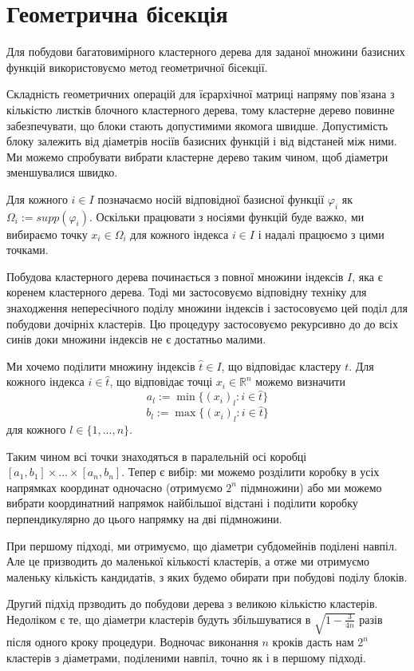 \documentclass[12pt]{report}
\begin{document}
 	\section{Геометрична бісекція}
	\hspace{0.8cm} Для побудови багатовимірного кластерного дерева для заданої множини базисних функцій використовуємо метод геометричної бісекції.
	\par Складність геометричних операцій для їєрархічної матриці напряму пов'язана з кількістю листків блочного кластерного дерева, тому кластерне дерево повинне забезпечувати, що блоки стають допустимими якомога швидше. Допустимість блоку залежить від діаметрів носіїв базисних функцій і від відстаней між ними. Ми можемо спробувати вибрати кластерне дерево таким чином, щоб діаметри зменшувалися швидко.
	\par Для кожного $i\in I$ позначаємо носій відповідної базисної функції $\varphi_i$ як $\Omega_i:=supp(\varphi_i)$. Оскільки працювати з носіями функцій буде важко, ми вибираємо точку $x_i\in\Omega_i$ для кожного індекса $i\in I$ і надалі працюємо з цими точками.
	\par Побудова кластерного дерева починається з повної множини індексів $I$, яка є коренем кластерного дерева. Тоді ми застосовуємо відповідну техніку для знаходження непересічного поділу множини індексів і застосовуємо цей поділ для побудови дочірніх кластерів. Цю процедуру застосовуємо рекурсивно до до всіх синів доки множини індексів не є достатньо малими. 
	\par Ми хочемо поділити множину індексів $\hat t\in I$, що відповідає кластеру $t$. Для кожного індекса $i \in \hat t$, що відповідає точці $x_i\in\mathbb{R}^n$ можемо визначити
	$$a_l:=\min \{(x_i)_l : i\in \hat t\}$$
	$$b_l:=\max \{(x_i)_l : i\in \hat t\}$$
	для кожного $l\in \{1,...,n\}$. 
	\par Таким чином всі точки знаходяться в паралельній осі коробці $[a_1,b_1]\times...\times[a_n,b_n]$. Тепер є вибір: ми можемо розділити коробку в усіх напрямках координат одночасно (отримуємо $2^n$ підмножини) або ми можемо вибрати координатний напрямок найбільшої відстані і поділити коробку перпендикулярно до цього напрямку на дві підмножини.
	\par При першому підході, ми отримуємо, що діаметри субдомейнів поділені навпіл. Але це призводить до маленької кількості кластерів, а отже ми отримуємо маленьку кількість кандидатів, з яких будемо обирати при побудові поділу блоків.
	\par Другий підхід прзводить до побудови дерева з великою кількістю кластерів. Недоліком є те, що діаметри кластерів будуть збільшуватися в $\sqrt{
	1-\frac{3}{4n}}$ разів після одного кроку процедури. Водночас виконання $n$ кроків дасть нам  $2^n$ кластерів з діаметрами, поділеними навпіл, точно як і в першому підході.
\end{document}
